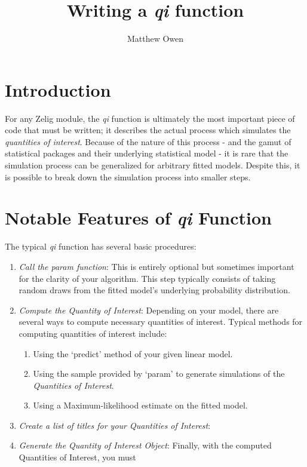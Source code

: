 \documentclass[10pt]{article}
\begin{document}
\title{Writing a \emph{qi} function}
\author{Matthew Owen}
\maketitle

\section{Introduction}
For any Zelig module, the \emph{qi} function is ultimately the most important piece of code that must be written; it describes the actual process which simulates the \emph{quantities of interest}.  Because of the nature of this process - and the gamut of statistical packages and their underlying statistical model - it is rare that the simulation process can be generalized for arbitrary fitted models.  Despite this, it is possible to break down the simulation process into smaller steps.


%
%
\section{Notable Features of \emph{qi} Function}
The typical \emph{qi} function has several basic procedures:
\begin{enumerate}
	\item{\emph{Call the param function}:  This is entirely optional but sometimes important for the clarity of your algorithm.  This step typically consists of taking random draws from the fitted model's underlying probability distribution.}
	\item{\emph{Compute the Quantity of Interest}: Depending on your model, there are several ways to compute necessary quantities of interest.  Typical methods for computing quantities of interest include:
		\begin{enumerate}
			\item{Using the `predict' method of your given linear model.}
			\item{Using the sample provided by `param' to generate simulations of the \emph{Quantities of Interest}.}
			\item{Using a Maximum-likelihood estimate on the fitted model.}
		\end{enumerate}}
	\item{\emph{Create a list of titles for your Quantities of Interest}:}
	\item{\emph{Generate the Quantity of Interest Object}: Finally, with the computed Quantities of Interest, you must }
\end{enumerate}
\end{document}
